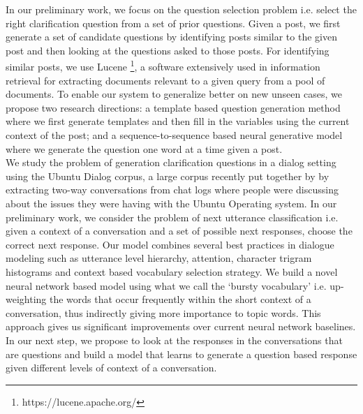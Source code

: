 \documentclass[11pt]{report}
\begin{document}
\noindent
In our preliminary work, we focus on the question selection problem i.e. select the right clarification question from a set of prior questions. Given a post, we first generate a set of candidate questions by identifying posts similar to the given post and then looking at the questions asked to those posts. For identifying similar posts, we use Lucene \footnote{https://lucene.apache.org/}, a software extensively used in information retrieval for extracting documents relevant to a given query from a pool of documents. To enable our system to generalize better on new unseen cases, we propose two research directions: a template based question generation method where we first generate templates and then fill in the variables using the current context of the post; and a sequence-to-sequence based neural generative model where we generate the question one word at a time given a post.\\

\noindent
We study the problem of generation clarification questions in a dialog setting using the Ubuntu Dialog corpus, a large corpus recently put together by \cite{} by extracting two-way conversations from chat logs where people were discussing about the issues they were having with the Ubuntu Operating system. In our preliminary work, we consider the problem of next utterance classification i.e. given a context of a conversation and a set of possible next responses, choose the correct next response. %
Our model combines several best practices in dialogue modeling such as utterance level hierarchy, attention, character trigram histograms and context based vocabulary selection strategy. 
We build a novel neural network based model using what we call the `bursty vocabulary' i.e. up-weighting the words that occur frequently within the short context of a conversation, thus indirectly giving more importance to topic words. This approach gives us significant improvements over current neural network baselines. In our next step, we propose to look at the responses in the conversations that are questions and build a model that learns to generate a question based response given different levels of context of a conversation.
\end{document}
